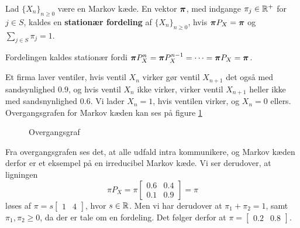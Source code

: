 \begin{defn}
Lad $\{X_n\}_{n \geq 0}$ være en Markov kæde. En vektor $\boldsymbol{\pi}$, med indgange $\pi_j \in \mathbb{R}^+$ for $j \in S$, kaldes en \textbf{stationær fordeling} af $\{X_n\}_{n \geq 0}$, hvis $\boldsymbol{\pi}P_X = \boldsymbol{\pi}$ og $\displaystyle \sum_{j \in S} \pi_j = 1$.
\end{defn}
Fordelingen kaldes stationær fordi $\boldsymbol{\pi} P_X^n = \boldsymbol{\pi} P_X^{n - 1} = \cdots = \boldsymbol{\pi} P_X = \boldsymbol{\pi}$.
\begin{example}
  Et firma laver ventiler, hvis ventil $X_{n}$ virker gør ventil $X_{n + 1}$ det også med sandsynlighed $0.9$, og hvis ventil $X_{n}$ ikke virker, virker ventil $X_{n + 1}$ heller ikke med sandsnynlighed $0.6$. Vi lader $X_{n} = 1$, hvis ventilen virker, og $X_{n} = 0$ ellers. Overgangsgrafen for Markov kæden kan ses på figure \ref{fig:eksempel_stationary}
  \begin{figure}[H]
    \centering
    \caption{Overgangsgraf}
    \label{fig:eksempel_stationary}
  \end{figure}\noindent
  Fra overgangsgrafen ses det, at alle udfald intra kommunikere, og Markov kæden derfor er et eksempel på en irreducibel Markov kæde. Vi ser derudover, at ligningen
  \begin{equation*}
    \pi P_{X} = \pi \begin{bmatrix}
                      0.6 & 0.4 \\ 0.1 & 0.9
                    \end{bmatrix} = \pi
  \end{equation*}
  løses af $\pi = s \begin{bmatrix} 1 & 4 \end{bmatrix}$, hvor $s \in \mathbb{R}$.
  Men vi har derudover at $\pi_{1} + \pi_{2} = 1$, samt $\pi_{1}, \pi_{2} \geq 0$, da der er tale om en fordeling.
  Det følger derfor at $\pi = \begin{bmatrix} 0.2 & 0.8 \end{bmatrix}$.
\end{example}

